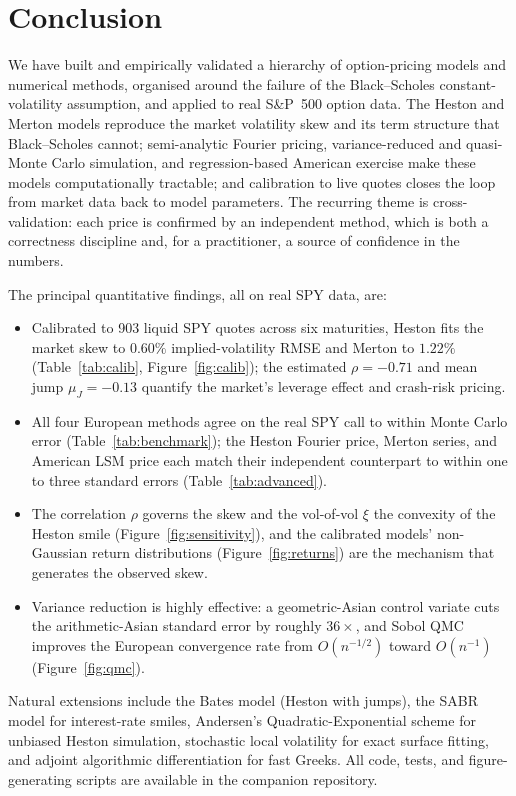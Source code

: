 \documentclass[11pt]{article}
\begin{document}
\section{Conclusion}
\label{sec:conclusion}

We have built and empirically validated a hierarchy of option-pricing models and
numerical methods, organised around the failure of the Black--Scholes
constant-volatility assumption, and applied to real S\&P~500 option data. The
Heston and Merton models reproduce the market volatility skew and its term
structure that Black--Scholes cannot; semi-analytic Fourier pricing,
variance-reduced and quasi-Monte Carlo simulation, and regression-based American
exercise make these models computationally tractable; and calibration to live
quotes closes the loop from market data back to model parameters. The recurring
theme is cross-validation: each price is confirmed by an independent method, which
is both a correctness discipline and, for a practitioner, a source of confidence
in the numbers.

The principal quantitative findings, all on real SPY data, are:
\begin{itemize}
\item Calibrated to 903 liquid SPY quotes across six maturities, Heston fits the
market skew to $0.60\%$ implied-volatility RMSE and Merton to $1.22\%$
(Table~\ref{tab:calib}, Figure~\ref{fig:calib}); the estimated $\rho=-0.71$ and
mean jump $\mu_J=-0.13$ quantify the market's leverage effect and crash-risk
pricing.
\item All four European methods agree on the real SPY call to within Monte Carlo
error (Table~\ref{tab:benchmark}); the Heston Fourier price, Merton series, and
American LSM price each match their independent counterpart to within one to three
standard errors (Table~\ref{tab:advanced}).
\item The correlation $\rho$ governs the skew and the vol-of-vol $\xi$ the
convexity of the Heston smile (Figure~\ref{fig:sensitivity}), and the calibrated
models' non-Gaussian return distributions (Figure~\ref{fig:returns}) are the
mechanism that generates the observed skew.
\item Variance reduction is highly effective: a geometric-Asian control variate
cuts the arithmetic-Asian standard error by roughly $36\times$, and Sobol QMC
improves the European convergence rate from $O(n^{-1/2})$ toward $O(n^{-1})$
(Figure~\ref{fig:qmc}).
\end{itemize}

Natural extensions include the Bates model (Heston with jumps), the SABR model
for interest-rate smiles, Andersen's Quadratic-Exponential scheme for unbiased
Heston simulation, stochastic local volatility for exact surface fitting, and
adjoint algorithmic differentiation for fast Greeks. All code, tests, and
figure-generating scripts are available in the companion repository.
\end{document}
